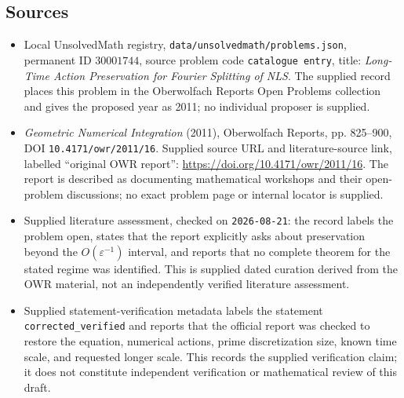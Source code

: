 \documentclass[11pt]{article}
\begin{document}
\subsection{Sources}
\begin{itemize}
\item Local UnsolvedMath registry, \texttt{data/unsolvedmath/problems.json}, permanent ID \(30001744\), source problem code \texttt{catalogue entry}, title: \emph{Long-Time Action Preservation for Fourier Splitting of NLS}. The supplied record places this problem in the Oberwolfach Reports Open Problems collection and gives the proposed year as 2011; no individual proposer is supplied.
\item \emph{Geometric Numerical Integration} (2011), Oberwolfach Reports, pp. 825--900, DOI \texttt{10.4171/owr/2011/16}. Supplied source URL and literature-source link, labelled ``original OWR report'': \url{https://doi.org/10.4171/owr/2011/16}. The report is described as documenting mathematical workshops and their open-problem discussions; no exact problem page or internal locator is supplied.
\item Supplied literature assessment, checked on \texttt{2026-08-21}: the record labels the problem open, states that the report explicitly asks about preservation beyond the \(O(\varepsilon^{-1})\) interval, and reports that no complete theorem for the stated regime was identified. This is supplied dated curation derived from the OWR material, not an independently verified literature assessment.
\item Supplied statement-verification metadata labels the statement \texttt{corrected\_verified} and reports that the official report was checked to restore the equation, numerical actions, prime discretization size, known time scale, and requested longer scale. This records the supplied verification claim; it does not constitute independent verification or mathematical review of this draft.
\end{itemize}
\end{document}
